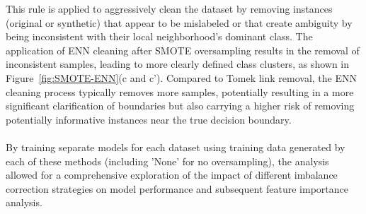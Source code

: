 \documentclass[12pt,a4paper]{report}
\begin{document}
This rule is applied to aggressively clean the dataset by removing instances (original or synthetic) that appear to be mislabeled or that create ambiguity by being inconsistent with their local neighborhood's dominant class. The application of ENN cleaning after SMOTE oversampling results in the removal of inconsistent samples, leading to more clearly defined class clusters, as shown in Figure~\ref{fig:SMOTE-ENN}(c and c'). Compared to Tomek link removal, the ENN cleaning process typically removes more samples, potentially resulting in a more significant clarification of boundaries but also carrying a higher risk of removing potentially informative instances near the true decision boundary.\\
\\
By training separate models for each dataset using training data generated by each of these methods (including 'None' for no oversampling), the analysis allowed for a comprehensive exploration of the impact of different imbalance correction strategies on model performance and subsequent feature importance analysis.
\end{document}
